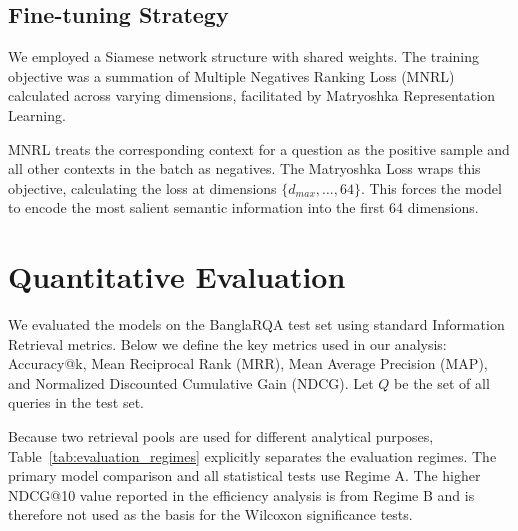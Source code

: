 \documentclass[manuscript,screen,review]{acmart}
\begin{document}
\subsection{Fine-tuning Strategy}
We employed a Siamese network structure with shared weights. The training objective was a summation of Multiple Negatives Ranking Loss (MNRL) calculated across varying dimensions, facilitated by Matryoshka Representation Learning.

MNRL treats the corresponding context for a question as the positive sample and all other contexts in the batch as negatives. The Matryoshka Loss wraps this objective, calculating the loss at dimensions $\{d_{max}, \dots, 64\}$. This forces the model to encode the most salient semantic information into the first 64 dimensions.

\section{Quantitative Evaluation}

We evaluated the models on the BanglaRQA test set using standard Information Retrieval metrics. Below we define the key metrics used in our analysis: Accuracy@k, Mean Reciprocal Rank (MRR), Mean Average Precision (MAP), and Normalized Discounted Cumulative Gain (NDCG). Let $Q$ be the set of all queries in the test set.

Because two retrieval pools are used for different analytical purposes, Table~\ref{tab:evaluation_regimes} explicitly separates the evaluation regimes. The primary model comparison and all statistical tests use Regime A. The higher NDCG@10 value reported in the efficiency analysis is from Regime B and is therefore not used as the basis for the Wilcoxon significance tests.
\end{document}
